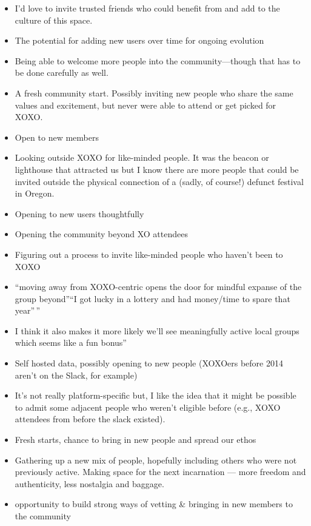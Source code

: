 \documentclass[
]{book}
\providecommand{\tightlist}{%
  \setlength{\itemsep}{0pt}\setlength{\parskip}{0pt}}
\begin{document}
\begin{itemize}
\tightlist
\item
  I'd love to invite trusted friends who could benefit from and add to the culture of this space.
\item
  The potential for adding new users over time for ongoing evolution
\item
  Being able to welcome more people into the community---though that has to be done carefully as well.
\item
  A fresh community start. Possibly inviting new people who share the same values and excitement, but never were able to attend or get picked for XOXO.
\item
  Open to new members
\item
  Looking outside XOXO for like-minded people. It was the beacon or lighthouse that attracted us but I know there are more people that could be invited outside the physical connection of a (sadly, of course!) defunct festival in Oregon.
\item
  Opening to new users thoughtfully
\item
  Opening the community beyond XO attendees
\item
  Figuring out a process to invite like-minded people who haven't been to XOXO
\item
  ``moving away from XOXO-centric opens the door for mindful expanse of the group beyond''``I got lucky in a lottery and had money/time to spare that year''\,''
\item
  I think it also makes it more likely we'll see meaningfully active local groups which seems like a fun bonus''
\item
  Self hosted data, possibly opening to new people (XOXOers before 2014 aren't on the Slack, for example)
\item
  It's not really platform-specific but, I like the idea that it might be possible to admit some adjacent people who weren't eligible before (e.g., XOXO attendees from before the slack existed).
\item
  Fresh starts, chance to bring in new people and spread our ethos
\item
  Gathering up a new mix of people, hopefully including others who were not previously active. Making space for the next incarnation --- more freedom and authenticity, less nostalgia and baggage.
\item
  opportunity to build strong ways of vetting \& bringing in new members to the community
\end{itemize}
\end{document}
